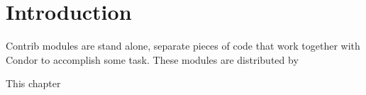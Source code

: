 \section{\label{sec:Contrib-Info}Introduction}

\MoreTodo

Contrib modules are stand alone, separate pieces of code that work
together with Condor to accomplish some task.
These modules are distributed by \Dots

This chapter \Dots


%

